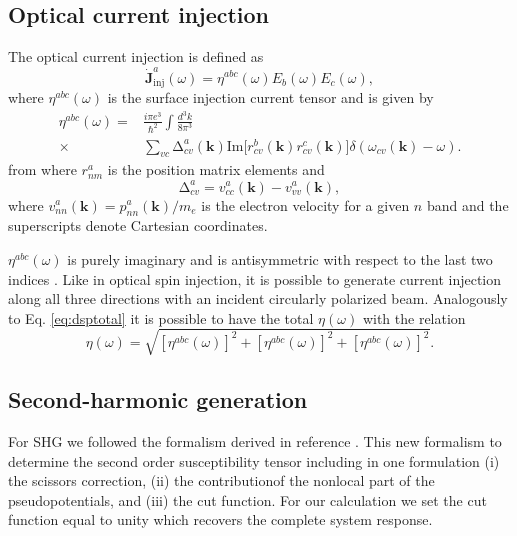 \documentclass[pss]{wiley2sp} %
\begin{document}
\subsection{Optical current injection}\label{sec:theory-OCI}

The optical current injection is defined as
\begin{equation*}
\mathbf{\dot{J}}^{a}_{\text{inj}}(\omega) =
\eta^{abc}(\omega)E_{b}(\omega)E_{c}(\omega), \label{eq:eta}
\end{equation*}
where $\eta^{abc}(\omega)$ is the surface injection current tensor and is given by
\begin{align*}
\eta^{abc}(\omega) =& \frac{i\pi e^{3}}{\hbar^{2}}\int\frac{d^{3}k}{8\pi^{3}}
\nonumber \\
\times &
\sum_{vc}\mathrm{\Delta}^{a}_{cv}(\mathbf{k})\text{Im}\big[r^{b}_{cv}(\mathbf{k})
r^{c}_{cv}(\mathbf{k})\big]\delta(\omega_{cv}(\mathbf{k})-\omega).
\end{align*}
from where $r^{a}_{nm}$ is the position matrix elements and 
\begin{equation*}
\mathrm{\Delta}^{a}_{cv} = v^{a}_{cc}(\mathbf{k})-v^{a}_{vv}(\mathbf{k}),
\end{equation*}
where $v^{a}_{nn}(\mathbf{k})=p^{a}_{nn}(\mathbf{k})/m_{e}$ is the electron velocity for a given $n$ band and the superscripts denote Cartesian coordinates.

$\eta^{abc}(\omega)$ is purely imaginary and is antisymmetric with respect to the last two indices \cite{sipePRB00,nastosPRB06}. Like in optical spin injection, it is possible to generate current injection along all three directions with an incident circularly polarized beam. Analogously to Eq. \eqref{eq:dsptotal} it is possible to have the total $\eta(\omega)$ with the relation
\begin{equation}\label{eq:etatotal}
\eta(\omega) = \sqrt{ [\eta^{abc}(\omega)]^{2} + [\eta^{abc}(\omega)]^{2} +[\eta^{abc}(\omega)]^{2}}.
\end{equation}

\subsection{Second-harmonic generation}\label{sec:theory-SHG}

For SHG we followed the formalism derived in reference \cite{andersonPRB15}. This new formalism to determine the second order susceptibility tensor including in one formulation (i) the scissors correction, (ii) the contributionof the nonlocal part of the pseudopotentials, and (iii) the cut function. For our calculation we set the cut function equal to unity which recovers the complete system response.
\end{document}
